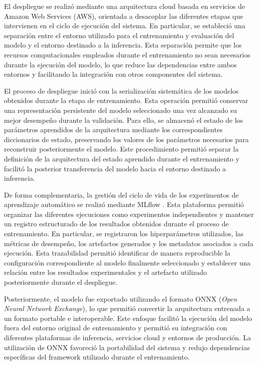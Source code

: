 El despliegue se realizó mediante una arquitectura cloud basada en servicios de Amazon Web Services (AWS), orientada a desacoplar las diferentes etapas que intervienen en el ciclo de ejecución del sistema. En particular, se estableció una separación entre el entorno utilizado para el entrenamiento y evaluación del modelo y el entorno destinado a la inferencia. Esta separación permite que los recursos computacionales empleados durante el entrenamiento no sean necesarios durante la ejecución del modelo, lo que reduce las dependencias entre ambos entornos y facilitando la integración con otros componentes del sistema.

El proceso de despliegue inició con la serialización sistemática de los modelos obtenidos durante la etapa de entrenamiento. Esta operación permitió conservar una representación persistente del modelo seleccionado una vez alcanzado su mejor desempeño durante la validación. Para ello, se almacenó el estado de los parámetros aprendidos de la arquitectura mediante los correspondientes diccionarios de estado, preservando los valores de los parámetros necesarios para reconstruir posteriormente el modelo. Este procedimiento permitió separar la definición de la arquitectura del estado aprendido durante el entrenamiento y facilitó la posterior transferencia del modelo hacia el entorno destinado a inferencia.

De forma complementaria, la gestión del ciclo de vida de los experimentos de aprendizaje automático se realizó mediante MLflow \cite{zaharia2018accelerating}. Esta plataforma permitió organizar las diferentes ejecuciones como experimentos independientes y mantener un registro estructurado de los resultados obtenidos durante el proceso de entrenamiento. En particular, se registraron los hiperparámetros utilizados, las métricas de desempeño, los artefactos generados y los metadatos asociados a cada ejecución. Esta trazabilidad permitió identificar de manera reproducible la configuración correspondiente al modelo finalmente seleccionado y establecer una relación entre los resultados experimentales y el artefacto utilizado posteriormente durante el despliegue.

Posteriormente, el modelo fue exportado utilizando el formato ONNX (\textit{Open Neural Network Exchange}), lo que permitió convertir la arquitectura entrenada a un formato portable e interoperable. Este enfoque facilitó la ejecución del modelo fuera del entorno original de entrenamiento y permitió su integración con diferentes plataformas de inferencia, servicios cloud y entornos de producción. La utilización de ONNX favoreció la portabilidad del sistema y redujo dependencias específicas del framework utilizado durante el entrenamiento.

